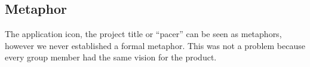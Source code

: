 \subsection{Metaphor}
The application icon, the project title or ``pacer'' can be seen as metaphors, however we never established a formal metaphor. This was not a problem because every group member had the same vision for the product. 

